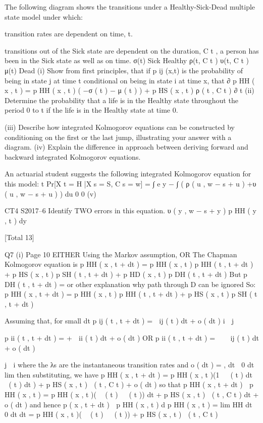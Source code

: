 \documentclass[a4paper,12pt]{article}
\begin{document}
The following diagram shows the transitions under a Healthy-Sick-Dead multiple
state model under which:
\item  transition rates are dependent on time, t.
\item  transitions out of the Sick state are dependent on the duration, C t , a person has
been in the Sick state as well as on time.
σ(t)
Sick
Healthy
ρ(t, C t )
υ(t, C t )
μ(t)
Dead
(i)
Show from first principles, that if p ij (x,t) is the probability of being in state j at
time t conditional on being in state i at time x, that
∂
p HH ( x , t ) = p HH ( x , t ) ( −σ ( t ) − μ ( t ) ) + p HS ( x , t ) ρ ( t , C t ) 
∂ t
(ii)
Determine the probability that a life is in the Healthy state throughout the
period 0 to t if the life is in the Healthy state at time 0.

(iii) Describe how integrated Kolmogorov equations can be constructed by
conditioning on the first or the last jump, illustrating your answer with a
diagram.
(iv) Explain the difference in approach between deriving forward and backward
integrated Kolmogorov equations.

An actuarial student suggests the following integrated Kolmogorov equation for this
model:
t
Pr[X t = H |X s = S, C s = w] = ∫ e
y
− ∫ ( ρ ( u , w − s + u ) +υ ( u , w − s + u ) ) du
0
0
(v)

CT4 S2017–6
Identify TWO errors in this equation.
υ ( y , w − s + y ) p HH ( y , t ) dy

[Total 13]


Q7
(i)
Page 10
EITHER
Using the Markov assumption,
OR
The Chapman Kolmogorov equation is
p HH ( x , t \;+\; dt ) \;=\; p HH ( x , t ) p HH ( t , t \;+\; dt )
\;+\; p HS ( x , t ) p SH ( t , t \;+\; dt ) \;+\; p HD ( x , t ) p DH ( t , t \;+\; dt ) 
But p DH ( t , t \;+\; dt ) \;= or other explanation why path through D can be
ignored 
So:
p HH ( x , t \;+\; dt ) \;=\; p HH ( x , t ) p HH ( t , t \;+\; dt ) \;+\; p HS ( x , t ) p SH ( t , t \;+\; dt )

Assuming that, for small dt
p ij ( t , t \;+\; dt ) \;=\;  ij ( t ) dt \;+\; o ( dt )
i  j

p ii ( t , t \;+\; dt ) \;= \;+\;  ii ( t ) dt \;+\; o ( dt )
OR
p ii ( t , t \;+\; dt ) \;=    ij ( t ) dt \;+\; o ( dt )

j  i
where the λs are the instantaneous transition rates and
o ( dt )
\;= ,
dt  0 dt
lim
then substituting, we have
p HH ( x , t \;+\; dt ) \;=\; p HH ( x , t )(1   ( t ) dt   ( t ) dt ) \;+\; p HS ( x , t )  ( t , C t ) \;+\; o ( dt )
so that
p HH ( x , t \;+\; dt )  p HH ( x , t ) \;=\; p HH ( x , t )(  ( t )   ( t )) dt
\;+\; p HS ( x , t )  ( t , C t ) dt \;+\; o ( dt )
and hence
p ( x , t \;+\; dt )  p HH ( x , t )
d
p HH ( x , t ) \;=\; lim HH
dt  0
dt
dt
\;=\; p HH ( x , t )(  ( t )   ( t )) \;+\; p HS ( x , t )  ( t , C t )
\end{document}
